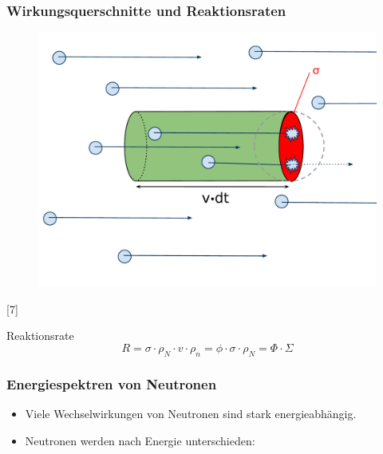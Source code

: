 \documentclass{beamer}[9pt]
\begin{document}
\begin{frame}
\frametitle{Wirkungsquerschnitte und Reaktionsraten}


\begin{figure}
\centering
\includegraphics[scale=0.2]{crossection.pdf}
\end{figure}
\hspace{.5\columnwidth}[7]
\begin{block}{Reaktionsrate}
\[
R =  \sigma \cdot \rho_N \cdot v \cdot \rho_n= \phi \cdot \sigma \cdot \rho_N = \Phi \cdot \Sigma
\]
\end{block}

\end{frame}

\begin{frame}
\frametitle{Energiespektren von Neutronen}
\begin{itemize}
\item Viele Wechselwirkungen von Neutronen sind stark energieabhängig.
\item Neutronen werden nach Energie unterschieden:
\end{itemize}
\end{frame}
\end{document}
